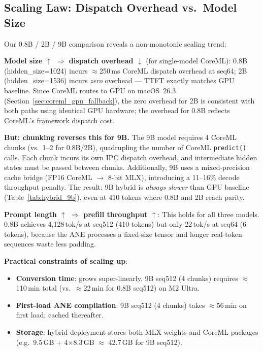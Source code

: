 \documentclass[11pt]{article}
\begin{document}
\subsection{Scaling Law: Dispatch Overhead vs.\ Model Size}
\label{sec:scaling}

Our 0.8B / 2B / 9B comparison reveals a non-monotonic scaling trend:

\textbf{Model size $\uparrow$ $\Rightarrow$ dispatch overhead $\downarrow$}
(for single-model CoreML):
0.8B (hidden\_size=1024) incurs $\approx$250\,ms CoreML dispatch overhead at seq64;
2B (hidden\_size=1536) incurs \emph{zero} overhead --- TTFT exactly matches GPU baseline.
Since CoreML routes to GPU on macOS~26.3
(Section~\ref{sec:coreml_gpu_fallback}), the zero overhead for 2B is
consistent with both paths using identical GPU hardware; the overhead for
0.8B reflects CoreML's framework dispatch cost.

\textbf{But: chunking reverses this for 9B.}
The 9B model requires 4 CoreML chunks (vs.\ 1--2 for 0.8B/2B), quadrupling
the number of CoreML \texttt{predict()} calls.
Each chunk incurs its own IPC dispatch overhead, and intermediate hidden
states must be passed between chunks.
Additionally, 9B uses a mixed-precision cache bridge (FP16 CoreML $\to$
8-bit MLX), introducing a 11--16\% decode throughput penalty.
The result: 9B hybrid is \emph{always slower} than GPU baseline
(Table~\ref{tab:hybrid_9b}), even at 410 tokens where 0.8B and 2B
reach parity.

\textbf{Prompt length $\uparrow$ $\Rightarrow$ prefill throughput $\uparrow$}:
This holds for all three models.
0.8B achieves 4{,}128\,tok/s at seq512 (410 tokens) but only 22\,tok/s at
seq64 (6 tokens), because the ANE processes a fixed-size tensor and
longer real-token sequences waste less padding.

\textbf{Practical constraints of scaling up}:
\begin{itemize}[topsep=2pt,itemsep=1pt]
  \item \textbf{Conversion time}: grows super-linearly.
    9B seq512 (4 chunks) requires $\approx$110\,min total
    (vs.\ $\approx$22\,min for 0.8B seq512) on M2 Ultra.
  \item \textbf{First-load ANE compilation}: 9B seq512 (4 chunks) takes
    $\approx$56\,min on first load; cached thereafter.
  \item \textbf{Storage}: hybrid deployment stores both MLX weights and
    CoreML packages (e.g.\ 9.5\,GB + 4$\times$8.3\,GB $\approx$ 42.7\,GB
    for 9B seq512).
\end{itemize}
\end{document}
